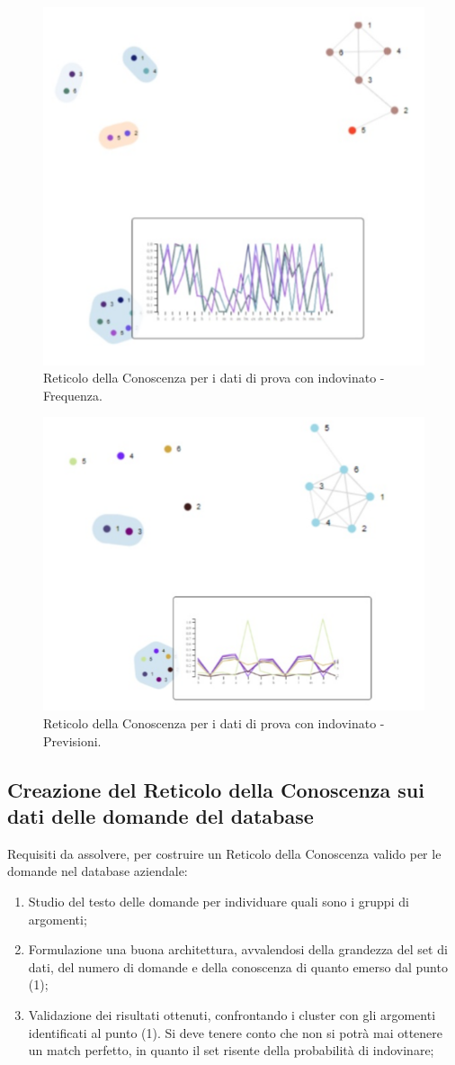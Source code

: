 \begin{figure}[H]
\centering
	\includegraphics[width=0.60\linewidth]{./image/collage_reticolo-probability-FREQ.png}
	\caption{Reticolo della Conoscenza per i dati di prova con indovinato - Frequenza.}
	\label{Reticolo della Conoscenza per i dati di prova con indovinato - Frequenza.}
\end{figure}
\noindent
\begin{figure}[H]
\centering
	\includegraphics[width=0.60\linewidth]{./image/collage_reticolo-probability.png}
	\caption{Reticolo della Conoscenza per i dati di prova con indovinato - Previsioni.}
	\label{Reticolo della Conoscenza per i dati di prova con indovinato - Previsioni.}
\end{figure}
\noindent


\subsection{Creazione del Reticolo della Conoscenza sui dati delle domande del database}
\label{Creazione del Reticolo della Conoscenza sui dati delle domande del database}

Requisiti da assolvere, per costruire un Reticolo della Conoscenza valido per le domande nel database aziendale:
\begin{enumerate}
\item Studio del testo delle domande per individuare quali sono i gruppi di argomenti;
\item Formulazione una buona architettura, avvalendosi della grandezza del set di dati, del numero di domande e della conoscenza di quanto emerso dal punto (1);
\item Validazione dei risultati ottenuti, confrontando i cluster con gli argomenti identificati al punto (1). Si deve tenere conto che non si potrà mai ottenere un match perfetto, in quanto il set risente della probabilità di indovinare;
\end{enumerate}


